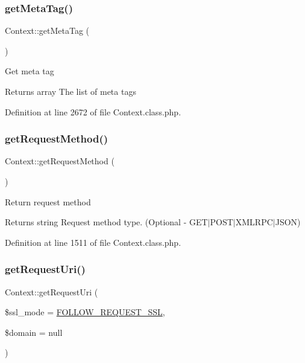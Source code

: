\subsubsection{\texorpdfstring{get\+Meta\+Tag()}{getMetaTag()}}
{\footnotesize\ttfamily Context\+::get\+Meta\+Tag (\begin{DoxyParamCaption}{ }\end{DoxyParamCaption})}

Get meta tag \begin{DoxyReturn}{Returns}
array The list of meta tags 
\end{DoxyReturn}


Definition at line 2672 of file Context.\+class.\+php.

\mbox{\label{classContext_a6912ff86e08ef782a296b77ff1307481}} 
\subsubsection{\texorpdfstring{get\+Request\+Method()}{getRequestMethod()}}
{\footnotesize\ttfamily Context\+::get\+Request\+Method (\begin{DoxyParamCaption}{ }\end{DoxyParamCaption})}

Return request method \begin{DoxyReturn}{Returns}
string Request method type. (Optional -\/ G\+E\+T$\vert$\+P\+O\+S\+T$\vert$\+X\+M\+L\+R\+P\+C$\vert$\+J\+S\+ON) 
\end{DoxyReturn}


Definition at line 1511 of file Context.\+class.\+php.

\mbox{\label{classContext_aa79578cfccee4d7f7c4890dc6e36ff90}} 
\subsubsection{\texorpdfstring{get\+Request\+Uri()}{getRequestUri()}}
{\footnotesize\ttfamily Context\+::get\+Request\+Uri (\begin{DoxyParamCaption}\item[{}]{\$ssl\+\_\+mode = {\ttfamily \hyperlink{Context_8class_8php_a546ef85538017b41b2928e818066989d}{F\+O\+L\+L\+O\+W\+\_\+\+R\+E\+Q\+U\+E\+S\+T\+\_\+\+S\+SL}},  }\item[{}]{\$domain = {\ttfamily null} }\end{DoxyParamCaption})}

